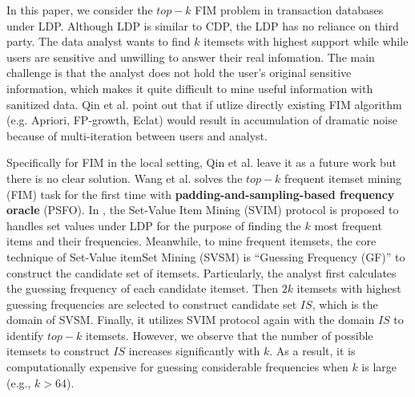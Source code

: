 \documentclass[conference]{IEEEtran}
\begin{document}
In this paper, we consider the $top-k$ FIM problem in transaction databases under LDP. Although LDP is similar to CDP, the LDP has no reliance on third party. The data analyst wants to find $k$ itemsets with highest support while while users are sensitive and unwilling to answer their real infomation. The main challenge is that the analyst does not hold the user's original sensitive information, which makes it quite difficult to mine useful information with sanitized data. Qin et al.\cite{a1} point out that if utlize directly existing FIM algorithm (e.g. Apriori\cite{apriori,apr}, FP-growth\cite{fp}, Eclat\cite{eclat}) would result in accumulation of dramatic noise because of multi-iteration between users and analyst.

Specifically for FIM in the local setting, Qin et al.\cite{a1} leave it as a future work but there is no clear solution. Wang et al.\cite{a2} solves  the $top-k$ frequent itemset mining (FIM) task for the first time with \textbf{padding-and-sampling-based frequency oracle} (PSFO). In \cite{a2}, the Set-Value Item Mining (SVIM) protocol is proposed to handles set values under LDP for the purpose of finding the $k$ most frequent items and their frequencies. Meanwhile, to mine frequent itemsets, the core technique of Set-Value itemSet Mining (SVSM) is ``Guessing Frequency (GF)'' to construct the candidate set of itemsets. Particularly, the analyst first calculates the guessing frequency of each candidate itemset. Then $2k$ itemsets with highest guessing frequencies are selected to construct candidate set $IS$, which is the domain of SVSM. Finally, it utilizes SVIM protocol again with the domain $IS$ to identify $top-k$ itemsets. However, we observe that the number of possible itemsets to construct $IS$ increases significantly with $k$. As a result, it is computationally expensive for guessing considerable frequencies when $k$ is large (e.g., $k > 64$). 

\end{document}
